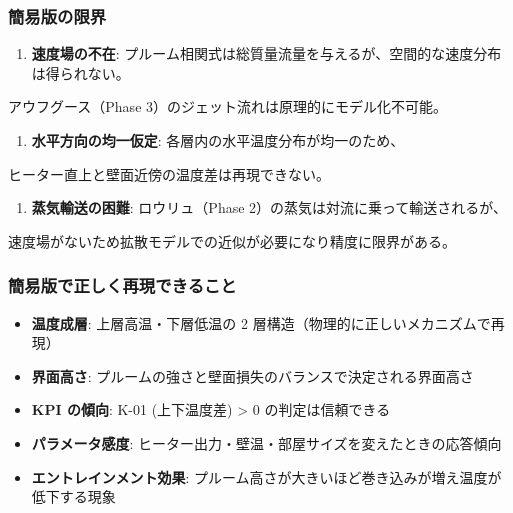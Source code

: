 \documentclass[a4paper,11pt]{article}
\begin{document}
\subsubsection{簡易版の限界}

\begin{enumerate} \item \textbf{速度場の不在}: プルーム相関式は総質量流量を与えるが、空間的な速度分布は得られない。 \end{enumerate}
   アウフグース（Phase 3）のジェット流れは原理的にモデル化不可能。
\begin{enumerate} \item \textbf{水平方向の均一仮定}: 各層内の水平温度分布が均一のため、 \end{enumerate}
   ヒーター直上と壁面近傍の温度差は再現できない。
\begin{enumerate} \item \textbf{蒸気輸送の困難}: ロウリュ（Phase 2）の蒸気は対流に乗って輸送されるが、 \end{enumerate}
   速度場がないため拡散モデルでの近似が必要になり精度に限界がある。

\subsubsection{簡易版で正しく再現できること}

\begin{itemize} \item \textbf{温度成層}: 上層高温・下層低温の 2 層構造（物理的に正しいメカニズムで再現） \end{itemize}
\begin{itemize} \item \textbf{界面高さ}: プルームの強さと壁面損失のバランスで決定される界面高さ \end{itemize}
\begin{itemize} \item \textbf{KPI の傾向}: K-01 (上下温度差) > 0 の判定は信頼できる \end{itemize}
\begin{itemize} \item \textbf{パラメータ感度}: ヒーター出力・壁温・部屋サイズを変えたときの応答傾向 \end{itemize}
\begin{itemize} \item \textbf{エントレインメント効果}: プルーム高さが大きいほど巻き込みが増え温度が低下する現象 \end{itemize}
\end{document}
